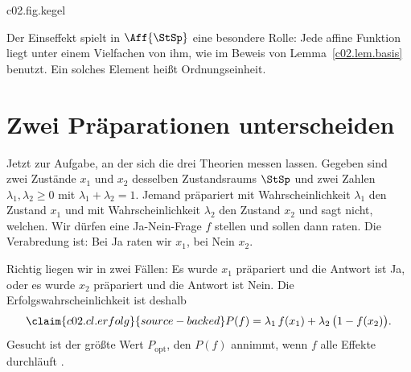 \begin{vertiefung}
  \begin{tpcfigure}{c02.fig.kegel}
    \caption{Die beiden Kegel des Quadrat-Bits aus \eqref{c02.eq.kegel-quadrat}. (a) Der
      Kegel $\AffDualPos{\StSp}$ der unnormierten Zustände. Der Zustandsraum $\StSp$ ist
      sein Schnitt mit der Ebene $t = 1$; jeder Strahl vom Nullpunkt durch den Kegel trifft
      $\StSp$ in genau einem Zustand $x$. (b) Der Kegel $\AffPos{\StSp}$ der positiven
      affinen Funktionen; nach oben ist $b$ aufgetragen. Die Effektmenge ist die
      gestrichelte Doppelpyramide zwischen $0$ und $\UnitEff{\StSp}$ aus
      Abbildung~\ref{c02.fig.effektmengen}(b). Der Kegel in (a) hat einen quadratischen
      Querschnitt mit Seiten parallel zu den Achsen, der in (b) einen um ein Achtel einer
      vollen Drehung gedrehten und schmaleren: Die beiden Kegel sind nicht gleich.}
  \end{tpcfigure}

  Der Einseffekt spielt in $\Aff{\StSp}$ eine besondere Rolle: Jede affine Funktion liegt
  unter einem Vielfachen von ihm, wie im Beweis von Lemma~\ref{c02.lem.basis} benutzt. Ein
  solches Element heißt Ordnungseinheit.
\end{vertiefung}

\section{Zwei Präparationen unterscheiden}\label{c02.s6}

Jetzt zur Aufgabe, an der sich die drei Theorien messen lassen. Gegeben sind zwei Zustände
$x_1$ und $x_2$ desselben Zustandsraums $\StSp$ und zwei Zahlen $\lambda_1, \lambda_2 \geq 0$
mit $\lambda_1 + \lambda_2 = 1$. Jemand präpariert mit Wahrscheinlichkeit $\lambda_1$ den
Zustand $x_1$ und mit Wahrscheinlichkeit $\lambda_2$ den Zustand $x_2$ und sagt nicht,
welchen. Wir dürfen eine Ja-Nein-Frage $f$ stellen und sollen dann raten. Die Verabredung
ist: Bei Ja raten wir $x_1$, bei Nein $x_2$.

Richtig liegen wir in zwei Fällen: Es wurde $x_1$ präpariert und die Antwort ist Ja, oder
es wurde $x_2$ präpariert und die Antwort ist Nein. Die Erfolgswahrscheinlichkeit ist
deshalb
\begin{equation}\label{c02.eq.erfolg}\claim{c02.cl.erfolg}{source-backed}
  P(f) = \lambda_1\, f(x_1) + \lambda_2\, \bigl(1 - f(x_2)\bigr) .
\end{equation}
Gesucht ist der größte Wert $P_{\mathrm{opt}}$, den $P(f)$ annimmt, wenn $f$ alle Effekte
durchläuft .

